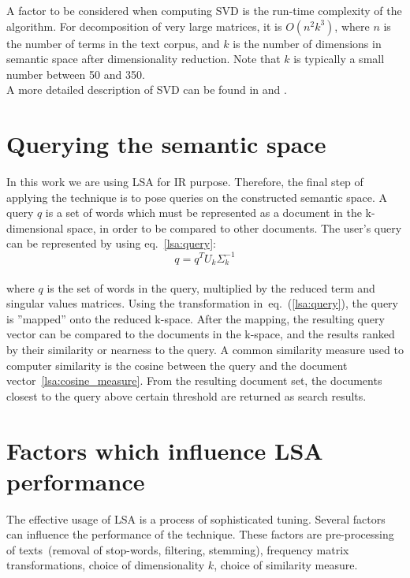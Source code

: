 A factor to be considered when computing \gls{SVD} is the run-time complexity of the algorithm. For decomposition of very large matrices, it is $O(n^2k^3)$, where $n$ is the number of terms in the text corpus, and $k$ is the number of dimensions in semantic space after dimensionality reduction. Note that  $k$ is typically a small number between 50 and 350.\\

A more detailed description of \gls{SVD} can be found in \cite{Berry95usinglinear} and \cite{MatrixCompGolub96}.\\

\section{Querying the semantic space}
\label{lsa:querying_sspace}

In this work we are using \gls{LSA} for \gls{IR} purpose. Therefore, the final step of applying the technique is to pose queries on the constructed semantic space. A query $q$ is a set of words which must be represented as a document in the k-dimensional space, in order to be compared to other documents. The user's query can be represented by using eq.~\ref{lsa:query}:
%
%
\begin{equation}
\label{lsa:query}
q = q^{T}U_{k}\Sigma_{k}^{-1}
\end{equation}\\
where $q$ is the set of words in the query, multiplied by the reduced term and singular values matrices. Using the transformation in~eq.~(\ref{lsa:query}), the query is ''mapped'' onto the reduced k-space. After the mapping, the resulting query vector can be compared to the documents in the k-space, and the results ranked by their similarity or nearness to the query. A common similarity measure used to computer similarity is the cosine between the query and the document vector~\ref{lsa:cosine_measure}. From the resulting document set, the documents closest to the query above certain threshold are returned as search results. \\

\section{Factors which influence LSA performance}
\label{sec:lsa:factors_infl_lsa}
The effective usage of \gls{LSA} is a process of sophisticated tuning. Several factors can influence the performance of the technique. These factors are pre-processing of texts~(removal of stop-words, filtering, stemming), frequency matrix transformations, choice of dimensionality $k$, choice of similarity measure.\\

